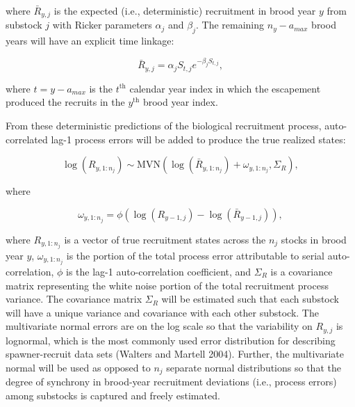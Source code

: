 \documentclass[12pt,]{book}
\theoremstyle{definition}
\theoremstyle{definition}
\theoremstyle{definition}
\theoremstyle{remark}
\begin{document}
\noindent
where \(\bar{R}_{y,j}\) is the expected (i.e., deterministic)
recruitment in brood year \(y\) from substock \(j\) with Ricker
parameters \(\alpha_j\) and \(\beta_j\). The remaining \(n_y - a_{max}\)
brood years will have an explicit time linkage:

\begin{equation}
  \bar{R}_{y,j} = \alpha_j S_{t,j} e^{-\beta_j S_{t,j}},
  \label{eq:tsm-ricker-pred}
\end{equation}

\noindent
where \(t = y-a_{max}\) is the \(t^{\text{th}}\) calendar year index in
which the escapement produced the recruits in the \(y^{\text{th}}\)
brood year index.

From these deterministic predictions of the biological recruitment
process, auto-correlated lag-1 process errors will be added to produce
the true realized states:

\begin{equation}
  \log(R_{y,1:n_j}) \sim \text{MVN}\left(\log(\bar{R}_{y,1:n_j}) + \omega_{y,1:n_j}, \Sigma_R\right),
  \label{eq:tsm-ricker-anomalies}
\end{equation}

\noindent
where

\begin{equation}
  \omega_{y,1:n_j} = \phi \left(\log(R_{y-1,j}) - \log(\bar{R}_{y-1,j}) \right),
  \label{eq:tsm-omega}
\end{equation}

\noindent
where \(R_{y,1:n_j}\) is a vector of true recruitment states across the
\(n_j\) stocks in brood year \(y\), \(\omega_{y,1:n_j}\) is the portion
of the total process error attributable to serial auto-correlation,
\(\phi\) is the lag-1 auto-correlation coefficient, and \(\Sigma_R\) is
a covariance matrix representing the white noise portion of the total
recruitment process variance. The covariance matrix \(\Sigma_R\) will be
estimated such that each substock will have a unique variance and
covariance with each other substock. The multivariate normal errors are
on the log scale so that the variability on \(R_{y,j}\) is lognormal,
which is the most commonly used error distribution for describing
spawner-recruit data sets (Walters and Martell 2004). Further, the
multivariate normal will be used as opposed to \(n_j\) separate normal
distributions so that the degree of synchrony in brood-year recruitment
deviations (i.e., process errors) among substocks is captured and freely
estimated.
\end{document}
